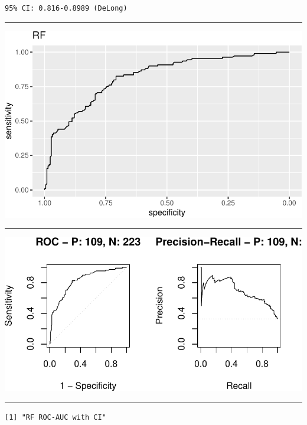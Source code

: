 \documentclass[
  letterpaper,
  DIV=11,
  numbers=noendperiod]{scrartcl}
\begin{document}
\begin{verbatim}
95% CI: 0.816-0.8989 (DeLong)
\end{verbatim}

\begin{center}\rule{0.5\linewidth}{0.5pt}\end{center}

\footnotesize

\includegraphics{L17v2_files/figure-pdf/unnamed-chunk-17-1.pdf}

\begin{center}\rule{0.5\linewidth}{0.5pt}\end{center}

\includegraphics{L17v2_files/figure-pdf/unnamed-chunk-18-1.pdf}

\begin{center}\rule{0.5\linewidth}{0.5pt}\end{center}

\footnotesize

\begin{verbatim}
[1] "RF ROC-AUC with CI"
\end{verbatim}
\end{document}
